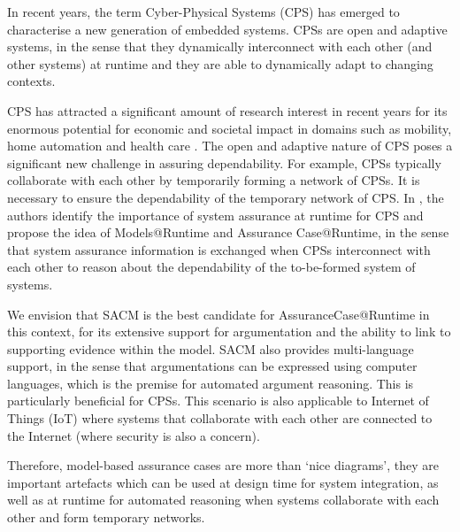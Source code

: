 In recent years, the term Cyber-Physical Systems (CPS) has emerged to characterise a new generation of embedded systems. 
CPSs are open and adaptive systems, in the sense that they dynamically interconnect with each other (and other systems) at runtime and they are able to dynamically adapt to changing contexts. 

CPS has attracted a significant amount of research interest in recent years for its enormous potential for economic and societal impact in domains such as mobility, home automation and health care \cite{wei2017deis}. 
The open and adaptive nature of CPS poses a significant new challenge in assuring dependability. 
For example, CPSs typically collaborate with each other by temporarily forming a network of CPSs. 
It is necessary to ensure the dependability of the temporary network of CPS.
In \cite{trapp2013safety}, the authors identify the importance of system assurance at runtime for CPS and propose the idea of Models@Runtime and Assurance Case@Runtime, in the sense that system assurance information is exchanged when CPSs interconnect with each other to reason about the dependability of the to-be-formed system of systems.

We envision that SACM is the best candidate for AssuranceCase@Runtime in this context, for its extensive support for argumentation and the ability to link to supporting evidence within the model. 
SACM also provides multi-language support, in the sense that argumentations can be expressed using computer languages, which is the premise for automated argument reasoning. This is particularly beneficial for CPSs.
This scenario is also applicable to Internet of Things (IoT) where systems that collaborate with each other are connected to the Internet (where security is also a concern). 

Therefore, model-based assurance cases are more than `nice diagrams', they are important artefacts which can be used at design time for system integration, as well as at runtime for automated reasoning when systems collaborate with each other and form temporary networks. 